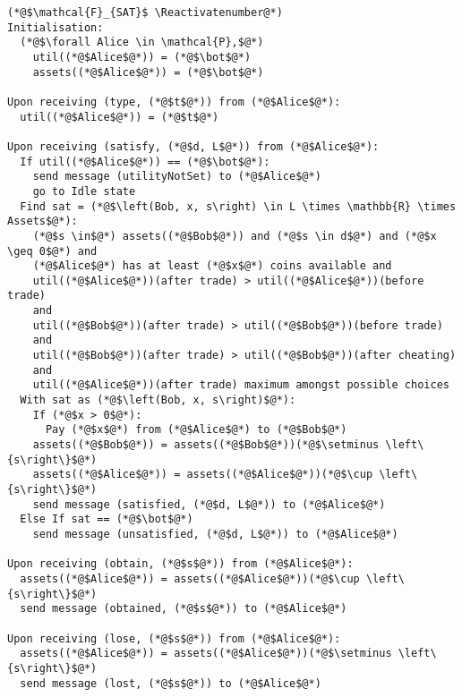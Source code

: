 \Suppressnumber
\begin{lstlisting}[label=satfunc, style=numbers]
(*@$\mathcal{F}_{SAT}$ \Reactivatenumber@*)
Initialisation:
  (*@$\forall Alice \in \mathcal{P},$@*)
    util((*@$Alice$@*)) = (*@$\bot$@*)
    assets((*@$Alice$@*)) = (*@$\bot$@*)

Upon receiving (type, (*@$t$@*)) from (*@$Alice$@*):
  util((*@$Alice$@*)) = (*@$t$@*)

Upon receiving (satisfy, (*@$d, L$@*)) from (*@$Alice$@*):
  If util((*@$Alice$@*)) == (*@$\bot$@*):
    send message (utilityNotSet) to (*@$Alice$@*)
    go to Idle state
  Find sat = (*@$\left(Bob, x, s\right) \in L \times \mathbb{R} \times Assets$@*):
    (*@$s \in$@*) assets((*@$Bob$@*)) and (*@$s \in d$@*) and (*@$x \geq 0$@*) and
    (*@$Alice$@*) has at least (*@$x$@*) coins available and
    util((*@$Alice$@*))(after trade) > util((*@$Alice$@*))(before trade)
    and
    util((*@$Bob$@*))(after trade) > util((*@$Bob$@*))(before trade)
    and
    util((*@$Bob$@*))(after trade) > util((*@$Bob$@*))(after cheating)
    and
    util((*@$Alice$@*))(after trade) maximum amongst possible choices
  With sat as (*@$\left(Bob, x, s\right)$@*):
    If (*@$x > 0$@*):
      Pay (*@$x$@*) from (*@$Alice$@*) to (*@$Bob$@*)
    assets((*@$Bob$@*)) = assets((*@$Bob$@*))(*@$\setminus \left\{s\right\}$@*)
    assets((*@$Alice$@*)) = assets((*@$Alice$@*))(*@$\cup \left\{s\right\}$@*)
    send message (satisfied, (*@$d, L$@*)) to (*@$Alice$@*)
  Else If sat == (*@$\bot$@*)
    send message (unsatisfied, (*@$d, L$@*)) to (*@$Alice$@*)

Upon receiving (obtain, (*@$s$@*)) from (*@$Alice$@*):
  assets((*@$Alice$@*)) = assets((*@$Alice$@*))(*@$\cup \left\{s\right\}$@*)
  send message (obtained, (*@$s$@*)) to (*@$Alice$@*)

Upon receiving (lose, (*@$s$@*)) from (*@$Alice$@*):
  assets((*@$Alice$@*)) = assets((*@$Alice$@*))(*@$\setminus \left\{s\right\}$@*)
  send message (lost, (*@$s$@*)) to (*@$Alice$@*)
\end{lstlisting}

